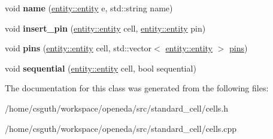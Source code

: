 \begin{DoxyCompactItemize}
\item 
\hypertarget{classophidian_1_1standard__cell_1_1cells_a0007b2ba1710f1614fd3c491b433e06d}{void {\bfseries name} (\hyperlink{classophidian_1_1entity_1_1entity}{entity\-::entity} e, std\-::string name)}\label{classophidian_1_1standard__cell_1_1cells_a0007b2ba1710f1614fd3c491b433e06d}

\item 
\hypertarget{classophidian_1_1standard__cell_1_1cells_a241460f336bad48e6616c216f6d66d85}{void {\bfseries insert\-\_\-pin} (\hyperlink{classophidian_1_1entity_1_1entity}{entity\-::entity} cell, \hyperlink{classophidian_1_1entity_1_1entity}{entity\-::entity} pin)}\label{classophidian_1_1standard__cell_1_1cells_a241460f336bad48e6616c216f6d66d85}

\item 
\hypertarget{classophidian_1_1standard__cell_1_1cells_a1188981026f1b070386d0e3b615b59f3}{void {\bfseries pins} (\hyperlink{classophidian_1_1entity_1_1entity}{entity\-::entity} cell, std\-::vector$<$ \hyperlink{classophidian_1_1entity_1_1entity}{entity\-::entity} $>$ \hyperlink{classophidian_1_1standard__cell_1_1pins}{pins})}\label{classophidian_1_1standard__cell_1_1cells_a1188981026f1b070386d0e3b615b59f3}

\item 
\hypertarget{classophidian_1_1standard__cell_1_1cells_ad524c127da5ae570e89cb37fb13a52b9}{void {\bfseries sequential} (\hyperlink{classophidian_1_1entity_1_1entity}{entity\-::entity} cell, bool sequential)}\label{classophidian_1_1standard__cell_1_1cells_ad524c127da5ae570e89cb37fb13a52b9}

\end{DoxyCompactItemize}


The documentation for this class was generated from the following files\-:\begin{DoxyCompactItemize}
\item 
/home/csguth/workspace/openeda/src/standard\-\_\-cell/cells.\-h\item 
/home/csguth/workspace/openeda/src/standard\-\_\-cell/cells.\-cpp\end{DoxyCompactItemize}
